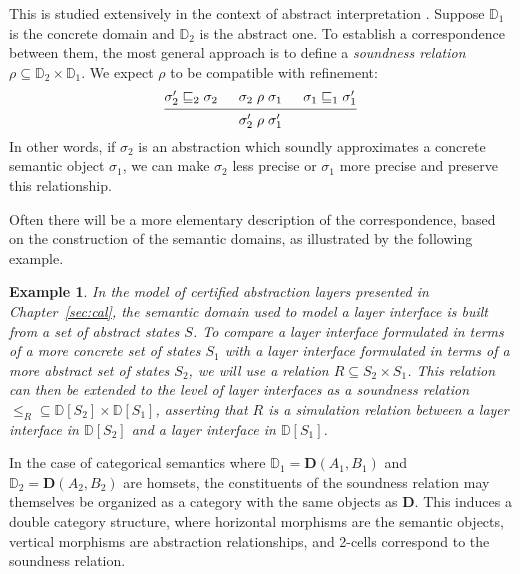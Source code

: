\documentclass[11pt,oneside]{book}
\newtheorem{example}[theorem]{Example}
\theoremstyle{definition}
\newcommand{\refby}{\sqsubseteq} %
\begin{document}
This is studied extensively
in the context of abstract interpretation \citep{aif}.
Suppose $\mathbb{D}_1$ is the concrete domain
and $\mathbb{D}_2$ is the abstract one.
To establish a correspondence between them,
the most general approach is to define a \emph{soundness relation}
$\rho \subseteq \mathbb{D}_2 \times \mathbb{D}_1$.
We expect $\rho$
to be compatible with refinement:
\[
  \begin{prooftree}
    \hypo{\sigma_2' \refby_2 \sigma_2}
    \hypo{\sigma_2 \mathrel{\rho} \sigma_1}
    \hypo{\sigma_1 \refby_1 \sigma_1'}
    \infer3{\sigma_2' \mathrel{\rho} \sigma_1'}
  \end{prooftree}
\]
In other words,
if $\sigma_2$ is an abstraction which soundly approximates
a concrete semantic object $\sigma_1$,
we can make $\sigma_2$ less precise or $\sigma_1$ more precise
and preserve this relationship.

Often there will be a more elementary description
of the correspondence,
based on the construction of the semantic domains,
as illustrated by the following example.

\begin{example} %
In the model of \emph{certified abstraction layers}
presented in Chapter~\ref{sec:cal},
the semantic domain used to model a layer interface
is built from a set of abstract states $S$.
To compare a layer interface formulated in terms of
a more concrete set of states $S_1$ with
a layer interface formulated in terms of
a more abstract set of states $S_2$,
we will use a relation $R \subseteq S_2 \times S_1$.
This relation can then be extended to the level of layer interfaces
as a soundness relation
${\le_R} \subseteq \mathbb{D}[S_2] \times \mathbb{D}[S_1]$,
asserting that $R$ is a simulation relation between
a layer interface in $\mathbb{D}[S_2]$ and
a layer interface in $\mathbb{D}[S_1]$.
\end{example}

In the case of categorical semantics
where $\mathbb{D}_1 = \mathbf{D}(A_1, B_1)$
and $\mathbb{D}_2 = \mathbf{D}(A_2, B_2)$
are homsets,
the constituents of the soundness relation
may themselves be organized as a category
with the same objects as $\mathbf{D}$.
This induces a double category structure,
where horizontal morphisms are the semantic objects,
vertical morphisms are abstraction relationships,
and 2-cells correspond to the soundness relation.
\end{document}
